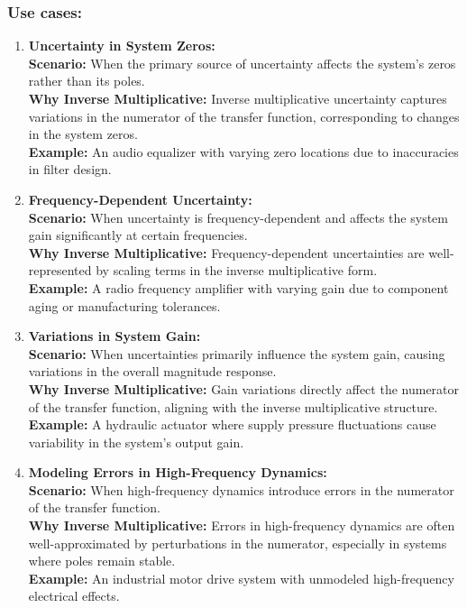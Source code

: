 \subsubsection{Use cases:}
\begin{enumerate}
    \item \textbf{Uncertainty in System Zeros:}\\
    \textbf{Scenario:} When the primary source of uncertainty affects the system’s zeros rather than its poles.\\
    \textbf{Why Inverse Multiplicative:} Inverse multiplicative uncertainty captures variations in the numerator of the transfer function, corresponding to changes in the system zeros.\\
    \textbf{Example:} An audio equalizer with varying zero locations due to inaccuracies in filter design.

    \item \textbf{Frequency-Dependent Uncertainty:}\\
    \textbf{Scenario:} When uncertainty is frequency-dependent and affects the system gain significantly at certain frequencies.\\
    \textbf{Why Inverse Multiplicative:} Frequency-dependent uncertainties are well-represented by scaling terms in the inverse multiplicative form.\\
    \textbf{Example:} A radio frequency amplifier with varying gain due to component aging or manufacturing tolerances.

    \item \textbf{Variations in System Gain:}\\
    \textbf{Scenario:} When uncertainties primarily influence the system gain, causing variations in the overall magnitude response.\\
    \textbf{Why Inverse Multiplicative:} Gain variations directly affect the numerator of the transfer function, aligning with the inverse multiplicative structure.\\
    \textbf{Example:} A hydraulic actuator where supply pressure fluctuations cause variability in the system's output gain.

    \item \textbf{Modeling Errors in High-Frequency Dynamics:}\\
    \textbf{Scenario:} When high-frequency dynamics introduce errors in the numerator of the transfer function.\\
    \textbf{Why Inverse Multiplicative:} Errors in high-frequency dynamics are often well-approximated by perturbations in the numerator, especially in systems where poles remain stable.\\
    \textbf{Example:} An industrial motor drive system with unmodeled high-frequency electrical effects.


\end{enumerate}
